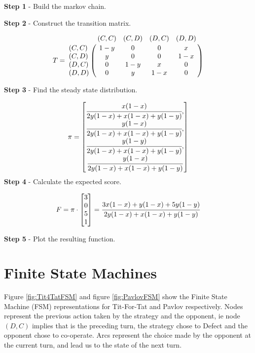 \textbf{Step 1} - Build the markov chain.

\textbf{Step 2} - Construct the transition matrix.

\begin{equation}\label{eq:transition_matrix}
%
T = \bordermatrix{~      & (C, C) & (C, D) & (D, C) & (D, D) \cr
                  (C, C) & 1 - y  & 0      & 0      & x      \cr
                  (C, D) & y      & 0      & 0      & 1 - x  \cr
                  (D, C) & 0      & 1 - y  & x      & 0      \cr
                  (D, D) & 0      & y      & 1 - x  & 0}
%
\end{equation}

\textbf{Step 3} - Find the steady state distribution.

\begin{equation}\label{eq:steady_state}
%
\pi =
\begin{bmatrix}
\cfrac{x (1 - x)}{2y(1-x) + x(1-x) + y(1-y)}, \\
\cfrac{y (1 - x)}{2y(1-x) + x(1-x) + y(1-y)}, \\
\cfrac{y (1 - y)}{2y(1-x) + x(1-x) + y(1-y)}, \\
\cfrac{y (1 - x)}{2y(1-x) + x(1-x) + y(1-y)}
\end{bmatrix}
\end{equation}
\textbf{Step 4} - Calculate the expected score.

\begin{equation}
F = \pi \cdot
\begin{bmatrix}
3 \\
0 \\
5 \\
1
\end{bmatrix}
=
\cfrac{3x(1-x) + y(1-x) + 5y(1-y)}{2y(1-x) + x(1-x) + y(1-y)}
\end{equation}

\textbf{Step 5} - Plot the resulting function.

\section{Finite State Machines}\label{sec:fsm}

Figure \ref{fig:Tit4TatFSM} and figure \ref{fig:PavlovFSM} show the Finite State Machine (FSM) representations for Tit-For-Tat and Pavlov respectively.
Nodes represent the previous action taken by the strategy and the opponent, ie node $(D, C)$ implies that is the preceding turn, the strategy chose to Defect and the opponent chose to co-operate.
Arcs represent the choice made by the opponent at the current turn, and lead us to the state of the next turn.

